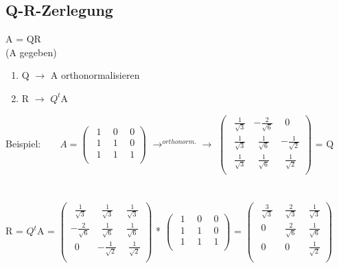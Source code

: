 \subsection{Q-R-Zerlegung}
	A = QR\\
	(A gegeben)
	\begin{enumerate}
		\item Q $\rightarrow$ A orthonormalisieren 
		\item R $\rightarrow$ $Q^t$A 
	\end{enumerate} 
	Beispiel:\ \ \ \  
	$A=	\left(\begin{array}{ccc}
		\ \ 1 &\ \ 0 &\ \ 0\\
		\ \ 1 &\ \ 1 &\ \ 0\\
		\ \ 1 &\ \ 1 &\ \ 1\\
	\end{array}\right)$
	$\rightarrow^{orthonorm.}\rightarrow$
	$\left(\begin{array}{ccc}
		\ \ \frac 1 {\sqrt 3}  & -\frac 2 {\sqrt 6} &\ \ 0\\
		\ \ \frac 1 {\sqrt 3} &\ \ \frac 1 {\sqrt 6} & -\frac 1 {\sqrt 2}\\
		\ \ \frac 1 {\sqrt 3} &\ \ \frac 1 {\sqrt 6} &\ \ \frac 1 {\sqrt 2}\\
	\end{array}\right)$ = Q\\\\\\
	R = $Q^t$A = 
	$\left(\begin{array}{ccc}
			\ \ \frac 1 {\sqrt 3}  &\ \ \frac 1 {\sqrt 3} &\ \frac 1 {\sqrt 3}\\
			 -\frac 2 {\sqrt 6} &\ \ \frac 1 {\sqrt 6} &\ \frac 1 {\sqrt 6}\\
			\ \ 0 & -\frac 1 {\sqrt 2} &\ \ \frac 1 {\sqrt 2}\\
		\end{array}\right)$ * 
	$\left(\begin{array}{ccc}
		\ \ 1 &\ \ 0 &\ \ 0\\
		\ \ 1 &\ \ 1 &\ \ 0\\
		\ \ 1 &\ \ 1 &\ \ 1\\
	\end{array}\right)$ =
	$\left(\begin{array}{ccc}
		\ \ \frac 3 {\sqrt 3} &\ \ \frac 2 {\sqrt 3} &\ \ \frac 1 {\sqrt 3}\\
		\ \ 0 &\ \ \frac 2 {\sqrt 6} &\ \ \frac 1 {\sqrt 6}\\
		\ \ 0 &\ \ 0 &\ \ \frac 1 {\sqrt 2}\\
	\end{array}\right)$

